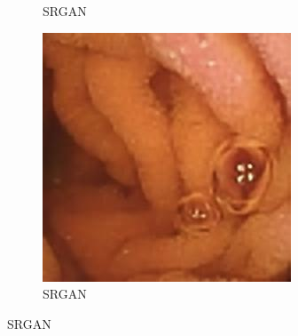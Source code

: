 \begin{figure}[H]
\begin{subfigure}[b]{0.275\textwidth}
    \caption{SRGAN}
  \end{subfigure}
  \begin{subfigure}[b]{0.275\textwidth}
    \includegraphics[width=\textwidth]{Chapter7/srgan_456.jpg}
    \caption{SRGAN}
  \end{subfigure}
  

\end{figure}

